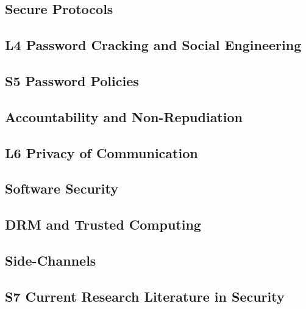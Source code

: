 %

\subsection{Secure Protocols}


\subsection{L4 Password Cracking and Social Engineering}


\subsection{S5 Password Policies}


\subsection{Accountability and Non-Repudiation}


\subsection{L6 Privacy of Communication}


\subsection{Software Security}


\subsection{DRM and Trusted Computing}


\subsection{Side-Channels}


\subsection{S7 Current Research Literature in Security}


